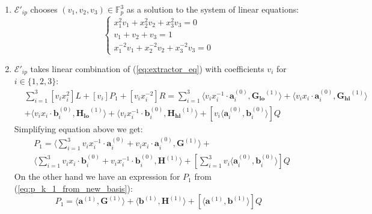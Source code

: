 \documentclass[../../book.tex]{subfiles}
\begin{document}
\begin{enumerate}
    \item $\mathcal{E}'_{ip}$ chooses $(v_1, v_2, v_3) \in \mathbb{F}_p^3 $ as a solution to the system of linear equations:
        \begin{equation}
            \begin{cases}
                x_1^2 v_1 + x_2^2 v_2 + x_3^2 v_3 = 0 \\
                v_1 + v_2 + v_3 = 1 \\
                x_1^{-2} v_1 + x_2^{-2} v_2 + x_3^{-2} v_3 = 0
            \end{cases}
            \label{eq:extractor_v}
        \end{equation}
    \item $\mathcal{E}'_{ip}$ takes linear combination of (\ref{eq:extractor_eq}) with coefficients $v_i$ for $i \in \{ 1,2,3 \}$:
        \begin{equation*}
            \begin{aligned}
                & \sum_{i=1}^3 [v_i x_i^2]L + [v_i]P_1 + [v_i x_i^{-2}]R = \sum_{i=1}^3 \langle v_i x_i^{-1} \cdot \mathbf{a}_i^{(0)}, \mathbf{G_{lo}}^{(1)} \rangle + \langle v_i x_i \cdot \mathbf{a}_i^{(0)}, \mathbf{G_{hi}}^{(1)} \rangle \\
                &+ \langle v_i x_i \cdot \mathbf{b}_i^{(0)}, \mathbf{H_{lo}}^{(1)} \rangle + \langle v_i x_i^{-1} \cdot \mathbf{b}_i^{(0)}, \mathbf{H_{hi}}^{(1)} \rangle + [v_i \langle \mathbf{a}_i^{(0)}, \mathbf{b}_i^{(0)} \rangle]Q
            \end{aligned}
        \end{equation*}
        Simplifying equation above we get:
        \begin{equation}
            \begin{aligned}
                & P_1 = \langle \sum_{i=1}^3 v_i x_i^{-1} \cdot \mathbf{a}_i^{(0)} + v_i x_i \cdot \mathbf{a}_i^{(0)}, \mathbf{G}^{(1)} \rangle +\\ 
                & \langle \sum_{i=1}^3 v_i x_i \cdot \mathbf{b}_i^{(0)} + v_i x_i^{-1} \cdot \mathbf{b}_i^{(0)}, \mathbf{H}^{(1)} \rangle + [\sum_{i=1}^3 v_i \langle \mathbf{a}_i^{(0)}, \mathbf{b}_i^{(0)} \rangle]Q
            \end{aligned}
            \label{eq:extractor_p1}
        \end{equation}
        On the other hand we have an expression for $P_1$ from (\ref{eq:p_k_1_from_new_basis}):
        \begin{equation}
            P_{1} = \langle \mathbf{a}^{(1)}, \mathbf{G}^{(1)} \rangle + \langle \mathbf{b}^{(1)}, \mathbf{H}^{(1)} \rangle + [\langle \mathbf{a}^{(1)}, \mathbf{b}^{(1)} \rangle]Q

\end{equation}
\end{enumerate}
\end{document}
